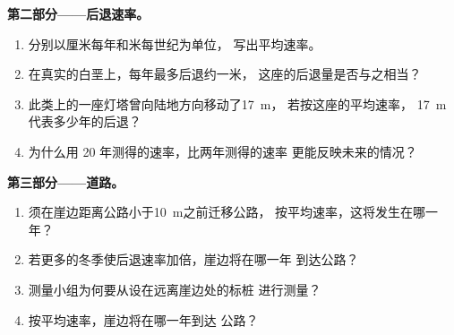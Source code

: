 \begin{problem}
\noindent\textbf{第二部分——后退速率。}\par\nopagebreak
\begin{enumerate}[resume, beginpenalty=10000]
  \item 分别以厘米每年和米每世纪为单位，
        写出平均速率。
  \item 在真实的白垩上，每年最多后退约一米，
        这座的后退量是否与之相当？
  \item 此类上的一座灯塔曾向陆地方向移动了\qty{17}{m}，
        若按这座的平均速率，
        \qty{17}{m}代表多少年的后退？
  \item 为什么用 20 年测得的速率，比两年测得的速率
        更能反映未来的情况？
\end{enumerate}

\noindent\textbf{第三部分——道路。}\par\nopagebreak
\begin{enumerate}[resume, beginpenalty=10000]
  \item 须在崖边距离公路小于\qty{10}{m}之前迁移公路，
        按平均速率，这将发生在哪一年？
  \item 若更多的冬季使后退速率加倍，崖边将在哪一年
        到达公路？
  \item 测量小组为何要从设在远离崖边处的标桩
        进行测量？
  \item 按平均速率，崖边将在哪一年到达
        公路？
\end{enumerate}
\end{problem}
